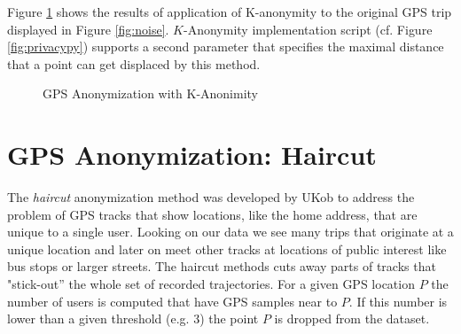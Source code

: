 Figure \ref{fig:k-ano} shows the results of application of K-anonymity
to the original GPS trip displayed in Figure \ref{fig:noise}.
$K$-Anonymity implementation script (cf. Figure \ref{fig:privacypy})
supports a second parameter that specifies the maximal distance that a
point can get displaced by this method.

\begin{figure}
  \centering
  \quad
  \caption{GPS Anonymization with K-Anonimity}
  \label{fig:k-ano}
\end{figure}

\section{GPS Anonymization: Haircut}

The \emph{haircut} anonymization method was developed by UKob to
address the problem of GPS tracks that show locations, like the home
address, that are unique to a single user. Looking on our data we see
many trips that originate at a unique location and later on meet other
tracks at locations of public interest like bus stops or larger
streets. The haircut methods cuts away parts of tracks that
"stick-out'' the whole set of recorded trajectories. For a given GPS
location $P$ the number of users is computed that have GPS samples
near to $P$. If this number is lower than a given threshold (e.g. $3$)
the point $P$ is dropped from the dataset.

